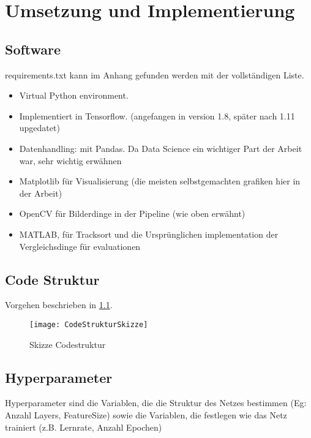 \chapter{Umsetzung und Implementierung}

\section{Software}

requirements.txt kann im Anhang gefunden werden mit der vollständigen Liste.

\begin{itemize}
    \item Virtual Python environment.
    \item Implementiert in Tensorflow. (angefangen in version 1.8, später nach 1.11 upgedatet)
    \item Datenhandling: mit Pandas. Da Data Science ein wichtiger Part der Arbeit war, sehr wichtig erwähnen
    \item Matplotlib für Visualisierung (die meisten selbstgemachten grafiken hier in der Arbeit)
    \item OpenCV für Bilderdinge in der Pipeline (wie oben erwähnt)
    \item MATLAB, für Tracksort und die Ursprünglichen implementation der Vergleichsdinge für evaluationen 
\end{itemize}


\section{Code Struktur}

Vorgehen beschrieben in \ref{CodeStruktur}.

\begin{figure}[h]
    \centering
    \texttt{[image: CodeStrukturSkizze]}
    \caption{Skizze Codestruktur}
    \label{CodeStruktur}
\end{figure}
  

\section{Hyperparameter}

Hyperparameter sind die Variablen, die die Struktur des Netzes bestimmen (Eg: Anzahl Layers, FeatureSize) 
sowie die Variablen, die festlegen wie das Netz trainiert (z.B. Lernrate, Anzahl Epochen)

